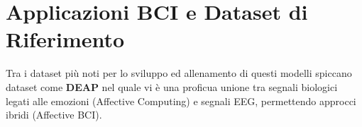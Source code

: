 \section{Applicazioni BCI e Dataset di Riferimento}
Tra i dataset più noti per lo sviluppo ed allenamento di questi modelli spiccano dataset come \textbf{DEAP} nel quale vi è una proficua unione tra segnali biologici legati alle emozioni (Affective Computing) e segnali EEG, permettendo approcci ibridi (Affective BCI).
